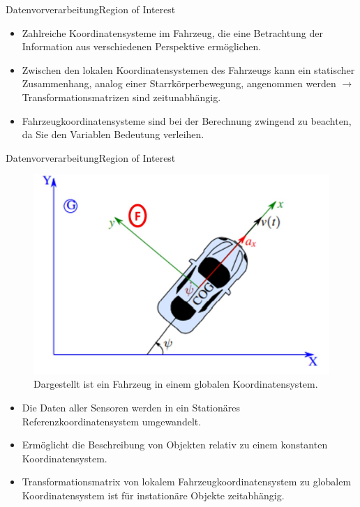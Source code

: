 \documentclass[169, handout	]{THIbeamer} %
\begin{document}
	\begin{frame}{Datenvorverarbeitung}{Region of Interest}
		\begin{itemize}
			\item Zahlreiche Koordinatensysteme im Fahrzeug, die eine Betrachtung der Information aus verschiedenen Perspektive ermöglichen.
			\item Zwischen den lokalen Koordinatensystemen des Fahrzeugs kann ein statischer Zusammenhang, analog einer Starrkörperbewegung, angenommen werden $\rightarrow$ Transformationsmatrizen sind zeitunabhängig.
			\item Fahrzeugkoordinatensysteme sind bei der Berechnung zwingend zu beachten, da Sie den Variablen Bedeutung verleihen.
%					
		\end{itemize}
	\end{frame}
	\begin{frame}{Datenvorverarbeitung}{Region of Interest}
		\begin{figure}
			\includegraphics[scale=0.3]{required/Globales Koordinatensystem.jpg}
			\caption{Dargestellt ist ein Fahrzeug in einem globalen Koordinatensystem.}
        	\label{Globales Koordinatensystem}
		\end{figure}
		\begin{itemize}
			\item Die Daten aller Sensoren werden in ein Stationäres Referenzkoordinatensystem umgewandelt.
			\item Ermöglicht die Beschreibung von Objekten relativ zu einem konstanten Koordinatensystem.
			\item Transformationsmatrix von lokalem Fahrzeugkoordinatensystem zu globalem Koordinatensystem ist für instationäre Objekte zeitabhängig.
		\end{itemize}					
	\end{frame}
\end{document}
